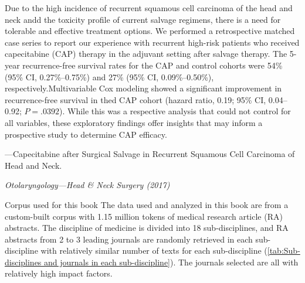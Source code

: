 \documentclass{ctexbook}
\begin{document}
\begin{sample}[label={myautocounter}]{\heiti}
  Due to the high incidence of recurrent squamous cell carcinoma of the head and neck andd the toxicity profile of current salvage regimens, there is a need for tolerable and effective treatment options. We performed a retrospective matched case series to report our experience with recurrent high-risk patients who received capecitabine (CAP) therapy in the adjuvant setting after salvage therapy. The 5-year recurrence-free survival rates for the CAP and control cohorts were 54\% (95\% CI, 0.27\%--0.75\%) and 27\% (95\% CI, 0.09\%--0.50\%), respectively.Multivariable Cox modeling showed a significant improvement in recurrence-free survival in thed CAP cohort (hazard ratio, 0.19; 95\% CI, 0.04--0.92; $P=.0 392$). While this was a respective analysis that could not control for all variables, these exploratory findings offer insights that may inform a prospective study to determine CAP efficacy.
  
  \begin{flushright}
    ---Capecitabine after Surgical Salvage in Recurrent Squamous Cell Carcinoma of Head and Neck. 
    
    \emph{Otolaryngology---Head \& Neck Surgery (2017)}
  \end{flushright}


\end{sample}

\begin{note}[label={myautocounter}]{\heiti Corpus used for this book}
  The data used and analyzed in this book are from a custom-built corpus with 1.15 million tokens of medical research article (RA) abstracts. The discipline of medicine is divided into 18 sub-disciplines, and RA abstracts from 2 to 3 leading journals are randomly retrieved in each sub-discipline with relatively similar number of texts for each sub-discipline (\autoref{tab:Sub-disciplines and journals in each sub-discipline}). The journals selected are all with relatively high impact factors.

\end{note}
\end{document}
